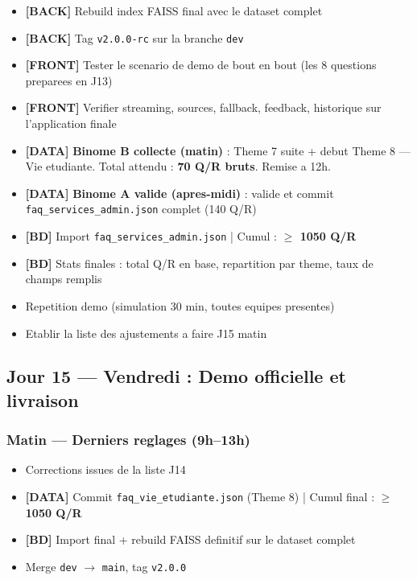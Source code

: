 \documentclass[11pt,a4paper]{article}
\newcommand{\back}{\textcolor{ragcolor}{\textbf{[BACK]}}}
\newcommand{\front}{\textcolor{reactcolor}{\textbf{[FRONT]}}}
\newcommand{\datas}{\textcolor{datacolor}{\textbf{[DATA]}}}
\newcommand{\db}{\textcolor{dbcolor}{\textbf{[BD]}}}
\begin{document}
\begin{itemize}
    \item[$\square$] \back{} Rebuild index FAISS final avec le dataset complet
    \item[$\square$] \back{} Tag \texttt{v2.0.0-rc} sur la branche \texttt{dev}
    \item[$\square$] \front{} Tester le scenario de demo de bout en bout (les 8 questions preparees en J13)
    \item[$\square$] \front{} Verifier streaming, sources, fallback, feedback, historique sur l'application finale
    \item[$\square$] \datas{} \textbf{Binome B collecte (matin)} : Theme 7 suite + debut Theme 8 --- Vie etudiante. Total attendu : \textbf{70 Q/R bruts}. Remise a 12h.
    \item[$\square$] \datas{} \textbf{Binome A valide (apres-midi)} : valide et commit \texttt{faq\_services\_admin.json} complet (140 Q/R)
    \item[$\square$] \db{} Import \texttt{faq\_services\_admin.json} | Cumul : \textbf{$\geq$ 1050 Q/R}
    \item[$\square$] \db{} Stats finales : total Q/R en base, repartition par theme, taux de champs remplis
    \item[$\square$] Repetition demo (simulation 30 min, toutes equipes presentes)
    \item[$\square$] Etablir la liste des ajustements a faire J15 matin
\end{itemize}

\subsection{Jour 15 --- Vendredi : Demo officielle et livraison}

\subsubsection{Matin --- Derniers reglages (9h--13h)}
\begin{itemize}
    \item[$\square$] Corrections issues de la liste J14
    \item[$\square$] \datas{} Commit \texttt{faq\_vie\_etudiante.json} (Theme 8) | Cumul final : \textbf{$\geq$ 1050 Q/R}
    \item[$\square$] \db{} Import final + rebuild FAISS definitif sur le dataset complet
    \item[$\square$] Merge \texttt{dev} $\rightarrow$ \texttt{main}, tag \texttt{v2.0.0}
\end{itemize}
\end{document}
